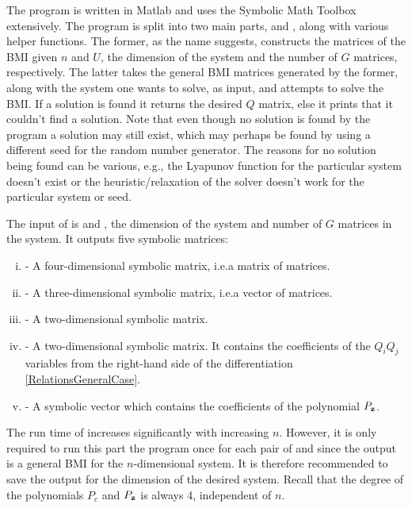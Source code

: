 \documentclass[a4paper,12pt,twoside,BCOR=10mm]{scrbook}
\begin{document}
The program is written in Matlab and uses the Symbolic Math Toolbox extensively. The program is split into two main parts,  and , along with various helper functions. The former, as the name suggests, constructs the matrices of the BMI given $n$ and $U$, the dimension of the system and the number of $G$ matrices, respectively. The latter takes the general BMI matrices generated by the former, along with the system one wants to solve, as input, and attempts to solve the BMI. If a solution is found it returns the desired $Q$ matrix, else it prints that it couldn't find a solution. Note that even though no solution is found by the program a solution may still exist, which may perhaps be found by using a different seed for the random number generator. The reasons for no solution being found can be various, e.g., the Lyapunov function for the particular system doesn't exist or the heuristic/relaxation of the solver doesn't work for the particular system or seed.

The input of  is  and , the dimension of the system and number of $G$ matrices in the system. It outputs five symbolic matrices:
\begin{enumerate}[i)]
    \item {} - A four-dimensional symbolic matrix, i.e.\@ a matrix of matrices.
    \item {} - A three-dimensional symbolic matrix, i.e.\@ a vector of matrices.
    \item {} - A two-dimensional symbolic matrix.
    \item {} - A two-dimensional symbolic matrix. It contains the coefficients of the $Q_iQ_j$ variables from the right-hand side of the differentiation \eqref{RelationsGeneralCase}.
    \item {} - A symbolic vector which contains the coefficients of the polynomial $P_{\mathbf{z}}$.
\end{enumerate}

The run time of  increases significantly with increasing $n$. However, it is only required to run this part the program once for each pair of  and  since the output is a general BMI for the $n$-dimensional system. It is therefore recommended to save the output for the dimension of the desired system. Recall that the degree of the polynomials $P_c$ and $P_{\mathbf{z}}$ is always 4, independent of $n$.
\end{document}

